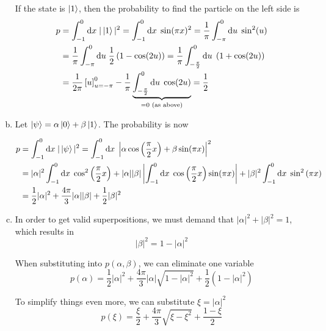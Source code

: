 \documentclass[a4paper,german,12pt,smallheadings]{scrartcl}
\begin{document}
\begin{enumerate}[a)]
    If the state is $\ket{1}$, then the probability to find the particle on the
    left side is
    \begin{align*}
      p
      &= \int_{-1}^0 \text{d}x \; |\ket{1}|^2
      = \int_{-1}^0 \text{d}x \; \sin(\pi x)^2
      = \frac{1}{\pi} \int_{-\pi}^0 \text{d}u \; \sin^2(u) \\
      &= \frac{1}{\pi} \int_{-\pi}^0 \text{d}u \; \frac{1}{2} \left(1- \cos(2u) \right)
      = \frac{1}{\pi} \int_{-\frac{\pi}{2}}^0 \text{d}u \; \left(1+ \cos(2u) \right) \\
      &= \frac{1}{2\pi} \left[u\right]_{u=-\pi}^0 - \frac{1}{\pi} \underbrace{\int_{-\frac{\pi}{2}}^0 \text{d}u \; \cos(2u)}_{=0\text{ (as above)}}
      = \frac{1}{2}
    \end{align*}
  \item
    Let $\ket{\psi} = \alpha \ket{0} + \beta \ket{1}$. The probability is now

    \begin{align*}
      p
      &= \int_{-1}^0 \text{d}x \; |\ket{\psi}|^2
      = \int_{-1}^0 \text{d}x \; \left|\alpha\cos\left(\frac{\pi}{2} x\right) + \beta\sin(\pi x)\right|^2 \\
      &= |\alpha|^2\int_{-1}^0 \text{d}x \; \cos^2\left(\frac{\pi}{2} x\right)
       + |\alpha||\beta| \left|\int_{-1}^0 \text{d}x \; \cos\left(\frac{\pi}{2} x\right)\sin(\pi x)\right|
       + |\beta|^2\int_{-1}^0 \text{d}x \; \sin^2\left(\pi x\right) \\
     &= \frac{1}{2} |\alpha|^2 + \frac{4\pi}{3} |\alpha| |\beta| + \frac{1}{2} |\beta|^2
    \end{align*}

  \item
    In order to get valid superpositions, we must demand that $|\alpha|^2 + |\beta|^2
    = 1$, which results in
    \begin{equation*}
      |\beta|^2 = 1-|\alpha|^2
    \end{equation*}

    When substituting into $p(\alpha, \beta)$, we can eliminate one variable
    \begin{equation*}
      p(\alpha) = \frac{1}{2} |\alpha|^2 + \frac{4 \pi}{3} |\alpha| \sqrt{1-|\alpha|^2} + \frac{1}{2}(1 - |\alpha|^2)
    \end{equation*}

    To simplify things even more, we can substitute $\xi = |\alpha|^2$
    \begin{equation*}
      p(\xi) = \frac{\xi}{2} + \frac{4 \pi}{3} \sqrt{\xi - \xi^2} + \frac{1- \xi}{2}
    \end{equation*}


\end{enumerate}
\end{document}
